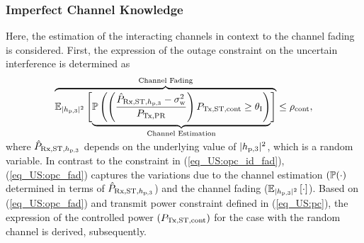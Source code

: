 \subsubsection{Imperfect Channel Knowledge}
Here, the estimation of the interacting channels in context to the channel fading is considered. First, the expression of the outage constraint on the uncertain interference is determined as 
\begin{align}
\smash[b]{\overbrace{{\mathbb E}_{|h_{\text{p,3}}|^2}\left[ \smash[b]{\underbrace{\mathbb P\left( \left( \frac{\hat{P}_{\text{Rx,ST,$h_{\text{p,3}}$}}- \sigma^2_{\text{w}}}{P_{\text{Tx,PR}}}\right) P_{\text{Tx,ST,cont}} \ge \theta_{\text{I}} \right)}_{\text{Channel Estimation}}} \right]}^{\text{Channel Fading}}} \le \rho_{\text{cont}}, \label{eq_US:opc_fad} \\[0.5em] \nonumber 
\end{align}
where $\hat{P}_{\text{Rx,ST,$h_{\text{p,3}}$}}$ depends on the underlying value of $|h_{\text{p,3}}|^2$, which is a random variable. In contrast to the constraint in (\ref{eq_US:opc_id_fad}), (\ref{eq_US:opc_fad}) captures the variations due to the channel estimation $(\mathbb P(\cdot)$ determined in terms of $\hat{P}_{\text{Rx,ST,$h_{\text{p,3}}$}}$) and the channel fading (${\mathbb E}_{|h_{\text{p,3}}|^2}\left[ \cdot \right]$). Based on (\ref{eq_US:opc_fad}) and transmit power constraint defined in (\ref{eq_US:pc}), the expression of the controlled power $(P_{\text{Tx,ST,cont}})$ for the case with the random channel is derived, subsequently.

